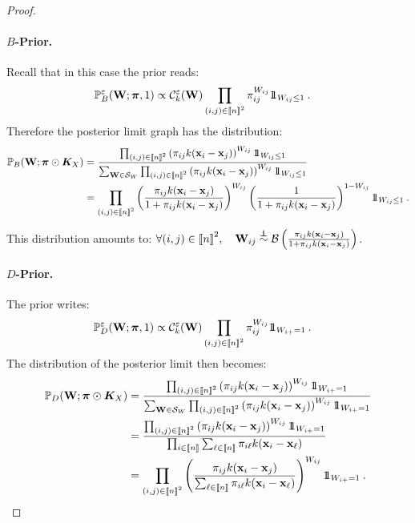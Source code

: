 \begin{proof}
\paragraph{$B$-Prior.}
Recall that in this case the prior reads:
\begin{align*}
    \mathbb{P}_{B}^{\varepsilon}({\mathbf{W}}; \bm{\pi},1) &\propto \mathcal{C}_{k}^{\varepsilon}({\mathbf{W}}) \prod_{(i,j) \in {[\![n]\!]}^2} \pi_{ij}^{W_{ij}} 1\!\!1_{W_{ij} \leq 1} \:.
\end{align*}
Therefore the posterior limit graph has the distribution:
\begin{align*}
    \mathbb{P}_{B}(\W ;\bm{\pi} \odot \bm{K}_{X})
    &= \frac{\prod_{(i,j) \in \integ{n}^2}  \left(\pi_{ij} k(\mathbf{x}_i - \mathbf{x}_j)\right)^{W_{ij}} \ind_{W_{ij} \leq 1}}{\sum_{\W \in \mathcal{S}_{W}} \prod_{(i,j) \in \integ{n}^2}  \left(\pi_{ij} k(\mathbf{x}_i - \mathbf{x}_j)\right)^{W_{ij}} \ind_{W_{ij} \leq 1}} \\
    &= \prod_{(i,j) \in \integ{n}^2}  \left(\frac{\pi_{ij} k(\mathbf{x}_i - \mathbf{x}_j)}{1+\pi_{ij} k(\mathbf{x}_i - \mathbf{x}_j)}\right)^{W_{ij}} \left(\frac{1}{1+\pi_{ij} k(\mathbf{x}_i - \mathbf{x}_j)}\right)^{1-W_{ij}} \ind_{W_{ij} \leq 1} \:.
\end{align*}

This distribution amounts to: $\forall (i,j) \in {[\![n]\!]}^2, \quad \mathbf{W}_{ij} \stackrel{\perp\!\!\!\!\perp}{\sim} \mathcal{B}\left( \frac{\pi_{ij} k(\mathbf{x}_i - \mathbf{x}_j)}{1+\pi_{ij} k(\mathbf{x}_i - \mathbf{x}_j)} \right)$.

\paragraph{$D$-Prior.} The prior writes:
\begin{align*}
    \mathbb{P}_{D}^{\varepsilon}({\mathbf{W}}; \bm{\pi}, 1) &\propto \mathcal{C}_{k}^{\varepsilon}({\mathbf{W}}) \prod_{(i,j) \in {[\![n]\!]}^2} \pi_{ij}^{W_{ij}} 1\!\!1_{W_{i+} = 1} \:.
\end{align*}
The distribution of the posterior limit then becomes:
\begin{align*}
    \mathbb{P}_{D}(\W ;\bm{\pi} \odot \bm{K}_{X}) &= \frac{\prod_{(i,j) \in \integ{n}^2}  \left(\pi_{ij} k(\mathbf{x}_i - \mathbf{x}_j)\right)^{W_{ij}} \ind_{W_{i+} = 1}}{\sum_{\W \in \mathcal{S}_{W}} \prod_{(i,j) \in \integ{n}^2}  \left(\pi_{ij} k(\mathbf{x}_i - \mathbf{x}_j)\right)^{W_{ij}} \ind_{W_{i+} = 1}} \\
    &= \frac{\prod_{(i,j) \in \integ{n}^2}  \left(\pi_{ij} k(\mathbf{x}_i - \mathbf{x}_j)\right)^{W_{ij}} \ind_{W_{i+} = 1}}{\prod_{i \in \integ{n}} \sum_{\ell \in \integ{n}} \pi_{i\ell} k(\mathbf{x}_i - \mathbf{x}_{\ell})} \\
    &= \prod_{(i,j) \in \integ{n}^2} \left(\frac{\pi_{ij} k(\mathbf{x}_i - \mathbf{x}_j)}{\sum_{\ell \in \integ{n}} \pi_{i\ell} k(\mathbf{x}_i - \mathbf{x}_{\ell})}\right)^{W_{ij}} \ind_{W_{i+} = 1} \:.
\end{align*}


\end{proof}
